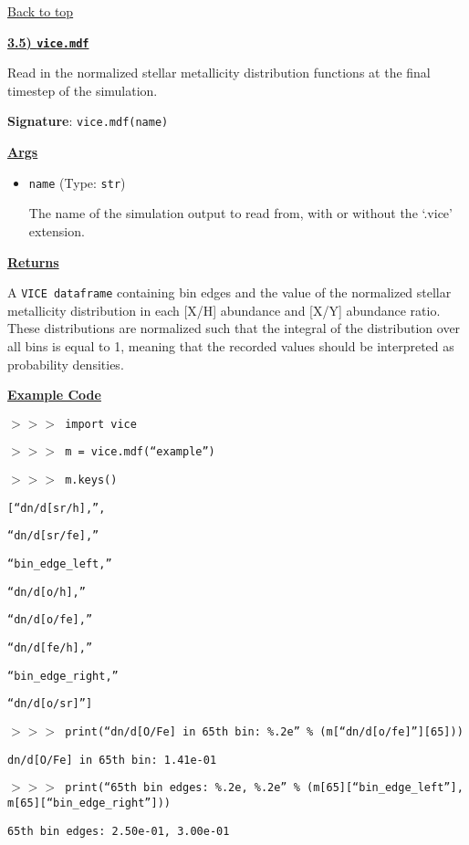 \documentclass{report}
\begin{document}
\vfill
\hyperlink{top}{Back to top}
\clearpage 

\newpage 
\noindent 
\begin{center} 
\hypertarget{func:mdf}{
	\underline{\LARGE
		\textbf{3.5) \texttt{vice.mdf}} 
	}
}
\end{center}
\par\null\par\noindent
Read in the normalized stellar metallicity distribution functions at the final 
timestep of the simulation. 
\par\null\par\noindent 
\textbf{Signature}: \texttt{vice.mdf(name)} 
\par\null\par\noindent 
\underline{\textbf{Args}}
\begin{itemize} 
	\item{
		\texttt{name} (Type: \texttt{str})
		\par
		The name of the simulation output to read from, with or without the 
		`.vice' extension. 
	}
\end{itemize}
\par\null\par\noindent 
\underline{\textbf{Returns}} 
\par\noindent
A \texttt{VICE dataframe} containing bin edges and the value of the normalized 
stellar metallicity distribution in each [X/H] abundance and [X/Y] abundance 
ratio. These distributions are normalized such that the integral of the 
distribution over all bins is equal to 1, meaning that the recorded values 
should be interpreted as probability densities. 
\par\null\par\noindent 
\underline{\textbf{Example Code}} 
\par\noindent 
\texttt{$>>>$ import vice} \par\noindent 
\texttt{$>>>$ m = vice.mdf(``example'')} \par\noindent 
\texttt{$>>>$ m.keys()} \par\noindent 
\texttt{[``dn/d[sr/h],'',} \par\noindent 
\texttt{``dn/d[sr/fe],''} \par\noindent 
\texttt{``bin\_edge\_left,''} \par\noindent 
\texttt{``dn/d[o/h],''} \par\noindent 
\texttt{``dn/d[o/fe],''} \par\noindent 
\texttt{``dn/d[fe/h],''} \par\noindent 
\texttt{``bin\_edge\_right,''} \par\noindent 
\texttt{``dn/d[o/sr]'']} \par\noindent 
\texttt{$>>>$ print(``dn/d[O/Fe] in 65th bin: \%.2e'' \% 
(m[``dn/d[o/fe]''][65]))} \par\noindent 
\texttt{dn/d[O/Fe] in 65th bin: 1.41e-01} \par\noindent 
\texttt{$>>>$ print(``65th bin edges: \%.2e, \%.2e'' \% 
(m[65][``bin\_edge\_left''], m[65][``bin\_edge\_right'']))} \par\noindent 
\texttt{65th bin edges: 2.50e-01, 3.00e-01} \par\noindent 
\end{document}
